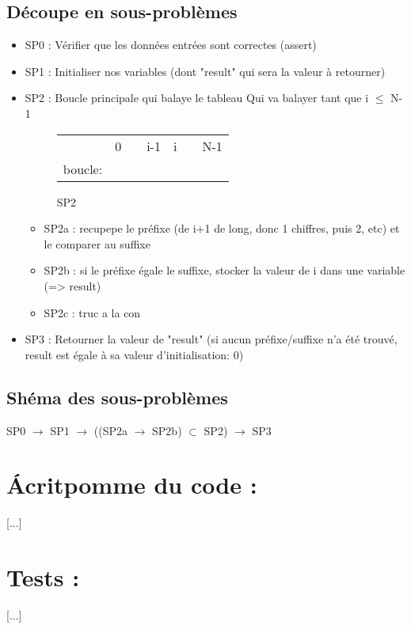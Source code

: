 \documentclass[a4paper, 11pt, oneside]{article}
\begin{document}
	\subsection{Découpe en sous-problèmes}
		\begin{itemize}
		
			\item SP0 : Vérifier que les données entrées sont correctes (assert)
			\item SP1 : Initialiser nos variables (dont "result" qui sera la valeur à retourner)
			\item SP2 : Boucle principale qui balaye le tableau
				\newline
				Qui va balayer tant que i $\leq$ N-1
				\begin{figure}[!h]
					\centering
					\begin{tabular}{l|llr|ll|l}
						& 0 &  & \multicolumn{1}{r|}{i-1} & i &  & N-1 \\ \cline{2-6}
						boucle: & \cellcolor[HTML]{FFCC67} & \cellcolor[HTML]{FFCC67} & \cellcolor[HTML]{FFCC67} &  &  &  \\ \cline{2-6}
					\end{tabular}
					\caption{SP2}
					\label{fig:exemple}
				\end{figure}
				\begin{itemize}
					\item SP2a : recupepe le préfixe (de i+1 de long, donc 1 chiffres, puis 2, etc) et le comparer au suffixe
					\item SP2b : si le préfixe égale le suffixe, stocker la valeur de i dans une variable (=> result)
                    \item SP2c : truc a la con
				\end{itemize}
			\item SP3 : Retourner la valeur de "result" (si aucun préfixe/suffixe n'a été trouvé, result est égale à sa valeur d'initialisation: 0)
		\end{itemize}
	\subsection{Shéma des sous-problèmes}
		SP0 $\rightarrow$ SP1 $\rightarrow$ ((SP2a $\rightarrow$ SP2b) $\subset$ SP2) $\rightarrow$ SP3

\section{\LARGE \bfseries Ácritpomme du code :}
	[...]

\section{\LARGE \bfseries Tests : }
	[...]
\end{document}

